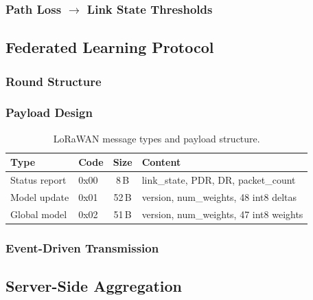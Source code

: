 \documentclass[12pt, a4paper, twoside, openright]{report}
\begin{document}
\subsubsection{Path Loss $\to$ Link State Thresholds}

\subsection{Federated Learning Protocol}

\subsubsection{Round Structure}

\subsubsection{Payload Design}
\begin{table}[H]
  \centering
  \begin{tabular}{llcp{5.5cm}}
    \toprule
    \textbf{Type} & \textbf{Code} & \textbf{Size} & \textbf{Content} \\
    \midrule
    Status report  & 0x00 & 8\,B  & link\_state, PDR, DR, packet\_count \\
    Model update   & 0x01 & 52\,B & version, num\_weights, 48 int8 deltas \\
    Global model   & 0x02 & 51\,B & version, num\_weights, 47 int8 weights \\
    \bottomrule
  \end{tabular}
  \caption{LoRaWAN message types and payload structure.}
  \label{tab:payloads}
\end{table}

\subsubsection{Event-Driven Transmission}

\subsection{Server-Side Aggregation}
\end{document}
